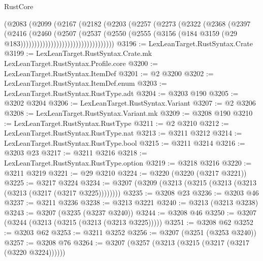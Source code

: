\begin{lexlean}{RustCore}
\begin{coremodule}
                                  (@2083
                                    (@2099
                                      (@2167
                                        (@2182
                                          (@2203
                                            (@2257
                                              (@2273
                                                (@2322
                                                  (@2368
                                                    (@2397
                                                      (@2416
                                                        (@2460
                                                          (@2507
                                                            (@2537
                                                              (@2550
                                                                (@2555
                                                                  (@3156
                                                                    (@184
                                                                      @3159
                                                                      (@29
                                                                        @183))))))))))))))))))))))))))))))))))
@3196 := LexLeanTarget.RustSyntax.Crate
@3199 := LexLeanTarget.RustSyntax.Crate.mk LexLeanTarget.RustSyntax.Profile.core
@3200 := LexLeanTarget.RustSyntax.ItemDef
@3201 := @2 @3200
@3202 := LexLeanTarget.RustSyntax.ItemDef.enum
@3203 := LexLeanTarget.RustSyntax.RustType.adt
@3204 := @3203 @190
@3205 := @3202 @3204
@3206 := LexLeanTarget.RustSyntax.Variant
@3207 := @2 @3206
@3208 := LexLeanTarget.RustSyntax.Variant.mk
@3209 := @3208 @190
@3210 := LexLeanTarget.RustSyntax.RustType
@3211 := @2 @3210
@3212 := LexLeanTarget.RustSyntax.RustType.nat
@3213 := @3211 @3212
@3214 := LexLeanTarget.RustSyntax.RustType.bool
@3215 := @3211 @3214
@3216 := @3203 @23
@3217 := @3211 @3216
@3218 := LexLeanTarget.RustSyntax.RustType.option
@3219 := @3218 @3216
@3220 := @3211 @3219
@3221 := @29 @3210
@3224 := @3220 (@3220 (@3217 @3221))
@3225 := @3217 @3224
@3234 := @3207 (@3209 (@3213 (@3215 (@3213 (@3213 (@3213 (@3217 (@3217 @3225))))))))
@3235 := @3208 @23
@3236 := @3203 @46
@3237 := @3211 @3236
@3238 := @3213 @3221
@3240 := @3213 (@3213 @3238)
@3243 := @3207 (@3235 (@3237 @3240))
@3244 := @3208 @46
@3250 := @3207 (@3244 (@3213 (@3215 (@3213 (@3213 @3225)))))
@3251 := @3208 @62
@3252 := @3203 @62
@3253 := @3211 @3252
@3256 := @3207 (@3251 (@3253 @3240))
@3257 := @3208 @76
@3264 := @3207 (@3257 (@3213 (@3215 (@3217 (@3217 (@3220 @3224))))))

\end{coremodule}
\end{lexlean}
